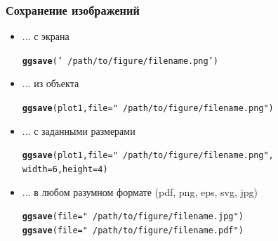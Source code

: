 \documentclass[compress]{beamer}\usepackage[]{graphicx}\usepackage[]{color}
\makeatletter
\newcommand{\hlnum}[1]{\textcolor[rgb]{0.686,0.059,0.569}{#1}}%
\newcommand{\hlstr}[1]{\textcolor[rgb]{0.192,0.494,0.8}{#1}}%
\newcommand{\hlstd}[1]{\textcolor[rgb]{0.345,0.345,0.345}{#1}}%
\newcommand{\hlkwc}[1]{\textcolor[rgb]{0.333,0.667,0.333}{#1}}%
\newcommand{\hlkwd}[1]{\textcolor[rgb]{0.737,0.353,0.396}{\textbf{#1}}}%
\newenvironment{kframe}{%
 \def\at@end@of@kframe{}%
 \ifinner\ifhmode%
  \def\at@end@of@kframe{\end{minipage}}%
  \begin{minipage}{\columnwidth}%
 \fi\fi%
 \def\FrameCommand##1{\hskip\@totalleftmargin \hskip-\fboxsep
 \colorbox{shadecolor}{##1}\hskip-\fboxsep
     \hskip-\linewidth \hskip-\@totalleftmargin \hskip\columnwidth}%
 \MakeFramed {\advance\hsize-\width
   \@totalleftmargin\z@ \linewidth\hsize
   \@setminipage}}%
 {\par\unskip\endMakeFramed%
 \at@end@of@kframe}
\newenvironment{knitrout}{}{} %
\makeatother
\begin{document}
\begin{frame}[fragile]
\frametitle{Сохранение изображений}
\begin{itemize}
\item ... с экрана
\begin{knitrout}\footnotesize
{}\color{fgcolor}\begin{kframe}
\begin{alltt}
\hlkwd{ggsave}\hlstd{(}\hlstr{'~/path/to/figure/filename.png'}\hlstd{)}
\end{alltt}
\end{kframe}
\end{knitrout}

\item ... из объекта
\begin{knitrout}\footnotesize
{}\color{fgcolor}\begin{kframe}
\begin{alltt}
\hlkwd{ggsave}\hlstd{(plot1,} \hlkwc{file} \hlstd{=} \hlstr{"~/path/to/figure/filename.png"}\hlstd{)}
\end{alltt}
\end{kframe}
\end{knitrout}

\item ... с заданными размерами
\begin{knitrout}\footnotesize
{}\color{fgcolor}\begin{kframe}
\begin{alltt}
\hlkwd{ggsave}\hlstd{(plot1,} \hlkwc{file} \hlstd{=} \hlstr{"~/path/to/figure/filename.png"}\hlstd{,}
  \hlkwc{width} \hlstd{=} \hlnum{6}\hlstd{,} \hlkwc{height} \hlstd{=} \hlnum{4}\hlstd{)}
\end{alltt}
\end{kframe}
\end{knitrout}

\item ... в любом разумном формате (pdf, png, eps, svg, jpg)
\begin{knitrout}\footnotesize
{}\color{fgcolor}\begin{kframe}
\begin{alltt}
\hlkwd{ggsave}\hlstd{(}\hlkwc{file} \hlstd{=} \hlstr{"~/path/to/figure/filename.jpg"}\hlstd{)}
\hlkwd{ggsave}\hlstd{(}\hlkwc{file} \hlstd{=} \hlstr{"~/path/to/figure/filename.pdf"}\hlstd{)}
\end{alltt}
\end{kframe}
\end{knitrout}

\end{itemize}
\end{frame}
\end{document}
